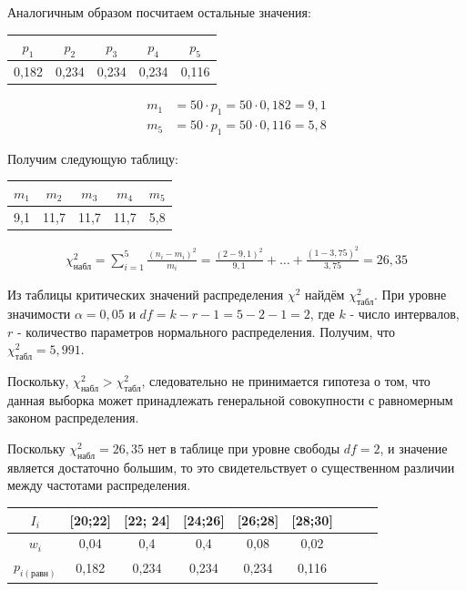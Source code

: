\documentclass[utf8, a4paper, 14pt, russian, oneside]{book}
\begin{document}
Аналогичным образом посчитаем остальные значения:
\begin{table}[h!]
    \centering
    \begin{tabular}{|c|c|c|c|c|}
        \hline
        $p_1$ & $p_2$ &$p_3$ &$p_4$ &$p_5$ \\
        \hline
        0,182 & 0,234 & 0,234 & 0,234 & 0,116 \\
        \hline
    \end{tabular}
\end{table}
\begin{align*}
    m_1 &= 50 \cdot p_1 = 50 \cdot 0,182 = 9,1 \\
    m_5 &= 50 \cdot p_1 = 50 \cdot 0,116 = 5,8
\end{align*}

Получим следующую таблицу:
\begin{table}[h!]
    \centering
    \begin{tabular}{|c|c|c|c|c|}
        \hline
        $m_1$ & $m_2$ &$m_3$ &$m_4$ &$m_5$ \\
        \hline
        9,1 & 11,7 & 11,7 & 11,7 & 5,8 \\
        \hline
    \end{tabular}
\end{table}
\begin{align*}
    \chi^2_{\text{набл}} = \sum\limits_{i=1}^{5} \frac{(n_i - m_i)^2}{m_i} = \frac{(2 - 9,1)^2}{9,1} + \dots + \frac{(1 - 3,75)^2}{3,75} = 26,35
\end{align*}

Из таблицы критических значений распределения $\chi^2$ найдём $\chi^2_{\text{табл}}$. При уровне значимости $\alpha = 0,05$ и $df = k - r - 1 = 5 - 2 - 1 = 2$,
где $k$ - число интервалов, $r$ - количество параметров нормального распределения. Получим, что $\chi^2_{\text{табл}} = 5,991$.

Поскольку, $\chi^2_{\text{набл}} > \chi^2_{\text{табл}}$, следовательно не принимается гипотеза о том, что данная выборка может принадлежать генеральной совокупности
с равномерным законом распределения.


Поскольку $\chi^2_{\text{набл}} = 26,35$ нет в таблице при уровне свободы $df=2$, и значение является достаточно большим, то это свидетельствует о существенном различии между частотами распределения.

\begin{table}[h!]
    \centering
    \begin{tabular}{|c|c|c|c|c|c|c|c|c|}
        \hline
        $I_i$  & [20;22] & [22; 24] & [24;26] & [26;28] & [28;30] \\
        \hline
        $w_i$ & 0,04 & 0,4 & 0,4 & 0,08 & 0,02 \\
        \hline
        $p_{i(\text{равн})}$ & 0,182 & 0,234 & 0,234 & 0,234 & 0,116 \\
        \hline
    \end{tabular}
\end{table}
\end{document}

